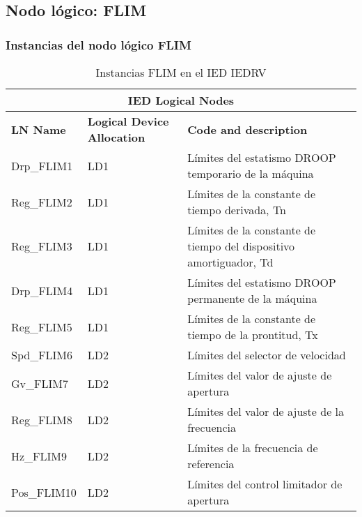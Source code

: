 
\subsection{Nodo l\'ogico: 			 FLIM}

    \subsubsection{Instancias del nodo l\'ogico FLIM}
    \begin{table}[H]
    \begin{center}
    \begin{tabular}{|l|l|p{6.8cm}|}
            \hline
            \multicolumn{3}{|c|}{\cellcolor[gray]{0.8} \textbf{IED Logical Nodes} } \\
            \hline
            \textbf{LN Name} & \textbf{Logical Device Allocation} & \textbf{Code and description} \\
            \hline
            Drp\_FLIM1 & LD1 & L\'imites del estatismo DROOP temporario de la m\'aquina \\
            \hline
            Reg\_FLIM2 & LD1 & L\'imites de la constante de tiempo derivada, Tn \\
            \hline
            Reg\_FLIM3 & LD1 & L\'imites de la constante de tiempo del dispositivo amortiguador, Td \\
            \hline
            Drp\_FLIM4 & LD1 & L\'imites del estatismo DROOP permanente de la m\'aquina \\
            \hline
            Reg\_FLIM5 & LD1 & L\'imites de la constante de tiempo de la prontitud, Tx \\
            \hline
            Spd\_FLIM6 & LD2 & L\'imites del selector de velocidad \\
            \hline
            Gv\_FLIM7 & LD2 & L\'imites del valor de ajuste de apertura \\
            \hline
            Reg\_FLIM8 & LD2 & L\'imites del valor de ajuste de la frecuencia \\
            \hline
            Hz\_FLIM9 & LD2 & L\'imites de la frecuencia de referencia \\
            \hline
            Pos\_FLIM10 & LD2 & L\'imites del control limitador de apertura \\
            \hline
    \end{tabular}
    \caption{Instancias FLIM en el IED IEDRV}
    \label{table:lnInstFLIM_tipical}
    \end{center}
    \end{table}
    
